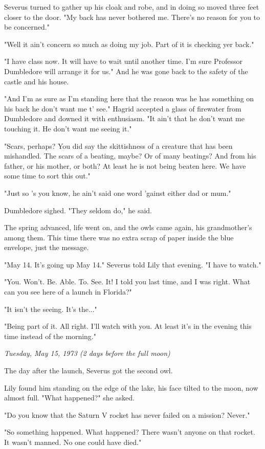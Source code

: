 \documentclass[a4paper,11pt]{article}
\begin{document}
Severus turned to gather up his cloak and robe, and in doing so moved three feet closer to the door. "My back has never bothered me. There's no reason for you to be concerned."

"Well it ain't concern so much as doing my job. Part of it is checking yer back."

"I have class now. It will have to wait until another time. I'm sure Professor Dumbledore will arrange it for us." And he was gone back to the safety of the castle and his house.

"And I'm as sure as I'm standing here that the reason was he has something on his back he don't want me t' see." Hagrid accepted a glass of firewater from Dumbledore and downed it with enthusiasm. "It ain't that he don't want me touching it. He don't want me seeing it."

"Scars, perhaps? You did say the skittishness of a creature that has been mishandled. The scars of a beating, maybe? Or of many beatings? And from his father, or his mother, or both? At least he is not being beaten here. We have some time to sort this out."

"Just so 's you know, he ain't said one word 'gainst either dad or mum."

Dumbledore sighed. "They seldom do," he said.

The spring advanced, life went on, and the owls came again, his grandmother's among them. This time there was no extra scrap of paper inside the blue envelope, just the message.

"May 14. It's going up May 14." Severus told Lily that evening. "I have to watch."

"You. Won't. Be. Able. To. See. It! I told you last time, and I was right. What can you see here of a launch in Florida?"

"It isn't the seeing. It's the..."

"Being part of it. All right. I'll watch with you. At least it's in the evening this time instead of the morning."

\emph{Tuesday, May 15, 1973 (2 days before the full moon)}

The day after the launch, Severus got the second owl.

Lily found him standing on the edge of the lake, his face tilted to the moon, now almost full. "What happened?" she asked.

"Do you know that the Saturn V rocket has never failed on a mission? Never."

"So something happened. What happened? There wasn't anyone on that rocket. It wasn't manned. No one could have died."
\end{document}

